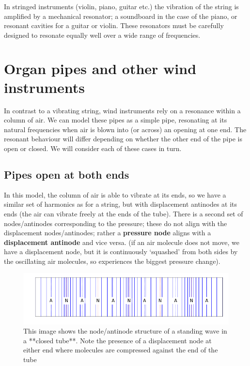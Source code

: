 \documentclass[
]{book}
\begin{document}
In stringed instruments (violin, piano, guitar etc.) the vibration of the string is amplified by a mechanical resonator; a soundboard in the case of the piano, or resonant cavities for a guitar or violin. These resonators must be carefully designed to resonate equally well over a wide range of frequencies.

\hypertarget{sec:ch10-pipesandwindinstruments}{%
\section{Organ pipes and other wind instruments}\label{sec:ch10-pipesandwindinstruments}}

In contrast to a vibrating string, wind instruments rely on a resonance within a column of air. We can model these pipes as a simple pipe, resonating at its natural frequencies when air is blown into (or across) an opening at one end. The resonant behaviour will differ depending on whether the other end of the pipe is open or closed. We will consider each of these cases in turn.

\hypertarget{pipes-open-at-both-ends}{%
\subsection{Pipes open at both ends}\label{pipes-open-at-both-ends}}

In this model, the column of air is able to vibrate at its ends, so we have a similar set of harmonics as for a string, but with displacement antinodes at its ends (the air can vibrate freely at the ends of the tube). There is a second set of nodes/antinodes corresponding to the pressure; these do not align with the displacement nodes/antinodes; rather a \textbf{pressure node} aligns with a \textbf{displacement antinode} and vice versa. (if an air molecule does not move, we have a displacement node, but it is continuously `squashed' from both sides by the oscillating air molecules, so experiences the biggest pressure change).

\begin{figure}

{\centering \includegraphics[width=0.7\linewidth]{visualisations/ch10-longitudinal-standingwave-n6closed} 

}

\caption{This image shows the node/antinode structure of a standing wave in a **closed tube**. Note the presence of a displacement node at either end where molecules are compressed against the end of the tube }\label{fig:ch10-waves-closedtube}
\end{figure}
\end{document}
